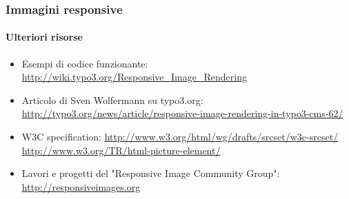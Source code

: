 
\begin{frame}[fragile]
	\frametitle{Immagini responsive}
	\framesubtitle{Ulteriori risorse}

	\begin{itemize}
		\item Esempi di codice funzionante:\newline
			\small\url{http://wiki.typo3.org/Responsive_Image_Rendering}\normalsize

		\item Articolo di Sven Wolfermann su typo3.org:\newline
			\small\url{http://typo3.org/news/article/responsive-image-rendering-in-typo3-cms-62/}\normalsize

		\item W3C specification:\newline
			\small\url{http://www.w3.org/html/wg/drafts/srcset/w3c-srcset/}\newline
			\small\url{http://www.w3.org/TR/html-picture-element/}

		\item Lavori e progetti del "Responsive Image Community Group":\newline
			\small\url{http://responsiveimages.org}\normalsize

	\end{itemize}

\end{frame}


